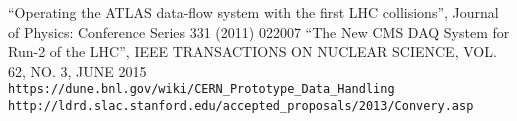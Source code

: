 \begin{thebibliography}{99}

 
 ``Operating the ATLAS data-flow system with the first LHC collisions'', Journal of Physics: Conference Series 331 (2011) 022007
 ``The New CMS DAQ System for Run-2 of the LHC'', IEEE TRANSACTIONS ON NUCLEAR SCIENCE, VOL. 62, NO. 3, JUNE 2015
 \verb!https://dune.bnl.gov/wiki/CERN_Prototype_Data_Handling!
 \verb!http://ldrd.slac.stanford.edu/accepted_proposals/2013/Convery.asp!
\end{thebibliography}